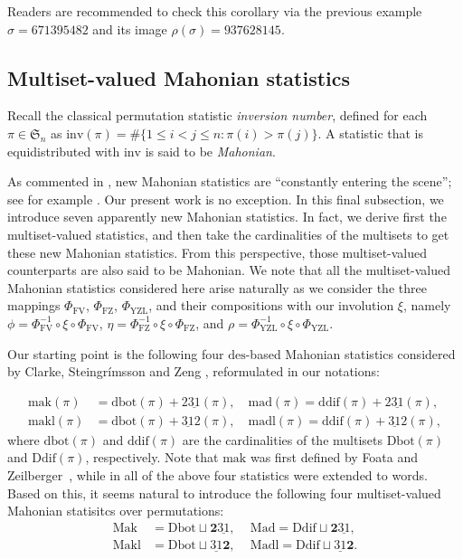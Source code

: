 \documentclass[12pt]{amsart}
\numberwithin{equation}{section}
\theoremstyle{plain}
\theoremstyle{definition}
\def\FV{\mathrm{FV}}
\def\FZ{\mathrm{FZ}}
\def\YZL{\mathrm{YZL}}
\def\SS{\mathfrak{S}}
\def\des{\mathrm{des}}
\def\Ddif{\mathrm{Ddif}}
\def\ddif{\mathrm{ddif}}
\def\Dbot{\mathrm{Dbot}}
\def\dbot{\mathrm{dbot}}
\def\ppwrs{\mathrm{2\underline{31}}}
\def\pp31-2{\mathrm{\underline{31}2}}
\def\leftdescent{\mathrm{\underline{31}}\mathbf{2}}
\def\rightdescent{\mathrm{\mathbf{2}\underline{31}}}
\def\Mak{\mathrm{Mak}}
\def\Mad{\mathrm{Mad}}
\def\Makl{\mathrm{Makl}}
\def\Madl{\mathrm{Madl}}
\def\inv{\mathrm{inv}}
\def\mak{\mathrm{mak}}
\def\mad{\mathrm{mad}}
\def\mak{\mathrm{mak}}
\def\inv{\mathrm{inv}}
\def\makl{\mathrm{makl}}
\def\madl{\mathrm{madl}}
\begin{document}
Readers are recommended to check this corollary via the previous example $\sigma=671395482$ and its image $\rho(\sigma)=937628145$.



\subsection{Multiset-valued Mahonian statistics}\label{subsec:Mahonian}
Recall the classical permutation statistic \emph{inversion number}, defined for each $\pi\in\SS_n$ as $\inv(\pi)=\#\{1\le i<j\le n : \pi(i)>\pi(j)\}.$ A statistic that is equidistributed with $\inv$ is said to be \emph{Mahonian}.

As commented in \cite{CSZ}, new Mahonian statistics are ``constantly entering the scene''; see for example \cite{FZ90,SS,CSZ,BS}. Our present work is no exception. In this final subsection, we introduce seven apparently new Mahonian statistics. In fact, we derive first the multiset-valued statistics, and then take the cardinalities of the multisets to get these new Mahonian statistics. From this perspective, those multiset-valued counterparts are also said to be Mahonian. We note that all the multiset-valued Mahonian statistics considered here arise naturally as we consider the three mappings $\Phi_{\FV}$, $\Phi_{\FZ}$, $\Phi_{\YZL}$, and their compositions with our involution $\xi$, namely $\phi=\Phi_{\FV}^{-1}\circ \xi \circ \Phi_{\FV}$, $\eta=\Phi_{\FZ}^{-1}\circ \xi \circ \Phi_{\FZ}$, and $\rho=\Phi_{\YZL}^{-1}\circ \xi \circ \Phi_{\YZL}$.

Our starting point is the following four $\des$-based Mahonian statistics considered by Clarke, Steingr\'{i}msson and Zeng \cite{CSZ}, reformulated in our notations:






\begin{align*}
   \mak(\pi) &=\dbot(\pi)+\ppwrs(\pi), \,\,\,\,\,\, \mad(\pi)=\ddif(\pi)+\ppwrs(\pi),   \\
 \makl(\pi)&=\dbot(\pi)+\pp31-2(\pi),\,\,\,\,\,\,
  \madl(\pi)  =\ddif(\pi)+ \pp31-2(\pi),
\end{align*}
where $\dbot(\pi)$ and $\ddif(\pi)$ are the cardinalities of the multisets $\Dbot(\pi)$ and $\Ddif(\pi)$, respectively. Note that $\mak$ was first defined by Foata and Zeilberger~\cite{FZ90}, while in \cite{CSZ} all of the above four statistics were extended to words.
Based on this, it seems natural to introduce the following four multiset-valued Mahonian statisitcs over permutations:
\begin{align}
\label{def:fourmulst1}
  \Mak &=\Dbot \sqcup \rightdescent,    \,\,\,\,\,\,\,
  \Mad =\Ddif \sqcup \rightdescent,  \\
  \Makl &=\Dbot \sqcup \leftdescent,    \,\,\,\,\,\,\,
  \Madl =\Ddif \sqcup \leftdescent.
  \label{def:fourmulst2}
\end{align}
\end{document}
